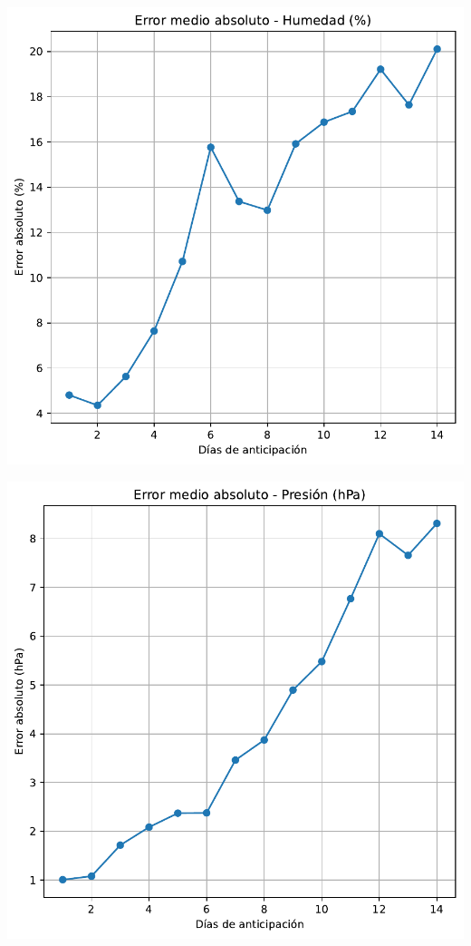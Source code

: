 \documentclass[
  10pt,
  a4paper,
  DIV=11,
  numbers=noendperiod,
  open=any]{scrreprt}
\makeatletter
\newcommand*\pandocbounded[1]{%
  \sbox\pandoc@box{#1}%
  \Gscale@div\@tempa{\textheight}{\dimexpr\ht\pandoc@box+\dp\pandoc@box\relax}%
  \Gscale@div\@tempb{\linewidth}{\wd\pandoc@box}%
  \ifdim\@tempb\p@<\@tempa\p@\let\@tempa\@tempb\fi%
  \ifdim\@tempa\p@<\p@\scalebox{\@tempa}{\usebox\pandoc@box}%
  \else\usebox{\pandoc@box}%
  \fi%
}
\numberwithin{equation}{chapter}
\numberwithin{equation}{section}
\renewcommand{\[}{\begin{equation}}
\renewcommand{\]}{\end{equation}}
\providecommand{\pandocbounded}[1]{#1}%
\renewcommand{\pandocbounded}[1]{\begingroup\centering #1\par\endgroup}
\makeatother
\begin{document}
\pandocbounded{\includegraphics[keepaspectratio]{03-meteorologia/predicciones_files/figure-pdf/cell-3-output-2.pdf}}

\pandocbounded{\includegraphics[keepaspectratio]{03-meteorologia/predicciones_files/figure-pdf/cell-3-output-3.pdf}}
\end{document}
